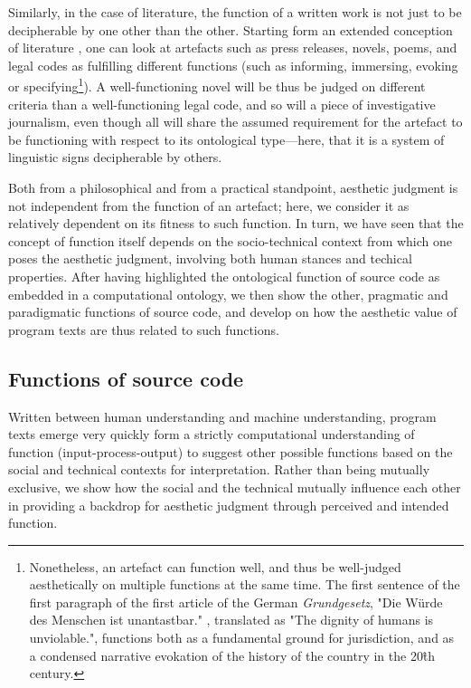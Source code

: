 Similarly, in the case of literature, the function of a written work is not just to be decipherable by one other than the other. Starting form an extended conception of literature \citep{gefen_extension_2019}, one can look at artefacts such as press releases, novels, poems, and legal codes as fulfilling different functions (such as informing, immersing, evoking or specifying\footnote{Nonetheless, an artefact can function well, and thus be well-judged aesthetically on multiple functions at the same time. The first sentence of the first paragraph of the first article of the German \emph{Grundgesetz}, "Die Würde des Menschen ist unantastbar." \citep{deutschebundestag_gg_2022}, translated as "The dignity of humans is unviolable.", functions both as a fundamental ground for jurisdiction, and as a condensed narrative evokation of the history of the country in the 20\^{th} century.}). A well-functioning novel will be thus be judged on different criteria than a well-functioning legal code, and so will a piece of investigative journalism, even though all will share the assumed requirement for the artefact to be functioning with respect to its ontological type—here, that it is a system of linguistic signs decipherable by others.

Both from a philosophical and from a practical standpoint, aesthetic judgment is not independent from the function of an artefact; here, we consider it as relatively dependent on its fitness to such function. In turn, we have seen that the concept of function itself depends on the socio-technical context from which one poses the aesthetic judgment, involving both human stances and techical properties. After having highlighted the ontological function of source code as embedded in a computational ontology, we then show the other, pragmatic and paradigmatic functions of source code, and develop on how the aesthetic value of program texts are thus related to such functions. 

\subsection{Functions of source code} %
\label{subsec:functions-source-code}

Written between human understanding and machine understanding, program texts emerge very quickly form a strictly computational understanding of function (input-process-output) to suggest other possible functions based on the social and technical contexts for interpretation. Rather than being mutually exclusive, we show how the social and the technical mutually influence each other in providing a backdrop for aesthetic judgment through perceived and intended function.


